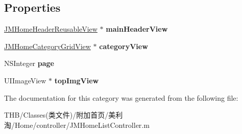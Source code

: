 \subsection*{Properties}
\begin{DoxyCompactItemize}
\item 
\mbox{\label{category_j_m_home_list_controller_07_08_af74c082165f76eabdbea5a8b2894be79}} 
\mbox{\hyperlink{interface_j_m_home_header_reusable_view}{J\+M\+Home\+Header\+Reusable\+View}} $\ast$ {\bfseries main\+Header\+View}
\item 
\mbox{\label{category_j_m_home_list_controller_07_08_a4674b8b0d5aaba47e306bd5501dd971f}} 
\mbox{\hyperlink{interface_j_m_home_category_grid_view}{J\+M\+Home\+Category\+Grid\+View}} $\ast$ {\bfseries category\+View}
\item 
\mbox{\label{category_j_m_home_list_controller_07_08_aa855705bb679b389056d4485680e6fcc}} 
N\+S\+Integer {\bfseries page}
\item 
\mbox{\label{category_j_m_home_list_controller_07_08_a9ad7c8b64dd61a5ee405eb45cdb5fe1c}} 
U\+I\+Image\+View $\ast$ {\bfseries top\+Img\+View}
\end{DoxyCompactItemize}


The documentation for this category was generated from the following file\+:\begin{DoxyCompactItemize}
\item 
T\+H\+B/\+Classes(类文件)/附加首页/美利淘/\+Home/controller/J\+M\+Home\+List\+Controller.\+m\end{DoxyCompactItemize}
